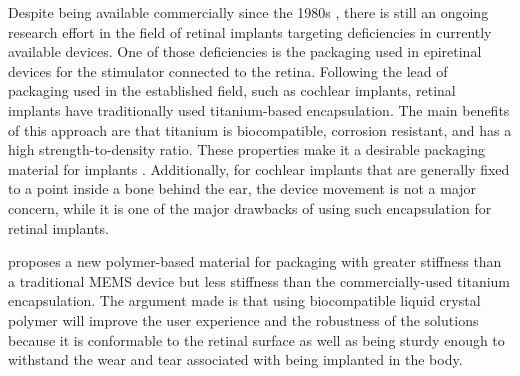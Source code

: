 Despite being available commercially since the 1980s \parencite{bloch_advances_2019}, there is still an ongoing research effort in the field of retinal implants targeting deficiencies in currently available devices. One of those deficiencies is the packaging used in epiretinal devices for the stimulator connected to the retina. Following the lead of packaging used in the established field, such as cochlear implants, retinal implants have traditionally used titanium-based encapsulation. The main benefits of this approach are that titanium is biocompatible, corrosion resistant, and has a high strength-to-density ratio. These properties make it a desirable packaging material for implants \parencite{jeong_miniaturized_2015}. Additionally, for cochlear implants that are generally fixed to a point inside a bone behind the ear, the device movement is not a major concern, while it is one of the major drawbacks of using such encapsulation for retinal implants. 

\textcite{jeong_miniaturized_2015} proposes a new polymer-based material for packaging with greater stiffness than a traditional MEMS device but less stiffness than the commercially-used titanium encapsulation. The argument made is that using biocompatible liquid crystal polymer will improve the user experience and the robustness of the solutions because it is conformable to the retinal surface as well as being sturdy enough to withstand the wear and tear associated with being implanted in the body. 

